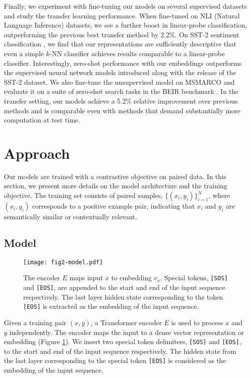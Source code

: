 \documentclass[nohyperref]{article}
\begin{document}
Finally, we experiment with fine-tuning our models on several supervised datasets and study the transfer learning performance. When fine-tuned on NLI (Natural Language Inference) datasets, we see a further boost in linear-probe classification, outperforming the previous best transfer method \cite{simcse} by 2.2\%. On SST-2 sentiment classification \cite{sst}, we find that our representations are sufficiently descriptive that even a simple $k$-NN classifier achieves results comparable to a linear-probe classifier. Interestingly, zero-shot performance with our embeddings outperforms the supervised neural network models introduced along with the release of the SST-2 dataset.  We also fine-tune the unsupervised model on MSMARCO and evaluate it on a suite of zero-shot search tasks in the BEIR benchmark \cite{beir}. In the transfer setting, our models achieve a 5.2\% relative improvement over previous methods \cite{contreiver} and is comparable even with methods \cite{colbert,splade,mini} that demand substantially more computation at test time.


\section{Approach}
\label{sec:approach}

Our models are trained with a contrastive objective on paired data. In this section, we present more details on the model architecture and the training objective. The training set consists of paired samples, $\{(x_i,y_i)\}^N_{i=1}$, where $(x_i,y_i)$ corresponds to a positive example pair, indicating that $x_i$ and $y_i$ are semantically similar or contextually relevant.

\subsection{Model}
\label{sec:model}

\begin{figure}[h]
\centering
\texttt{[image: fig2-model.pdf]}
\caption{The encoder $E$ maps input $x$ to embedding $v_x$. Special tokens, \texttt{[SOS]} and \texttt{[EOS]}, are appended to the start and end of the input sequence respectively. The last layer hidden state corresponding to the token \texttt{[EOS]} is extracted as the embedding of the input sequence.}
\label{fig:model}
\end{figure}

Given a training pair $(x,y)$, a Transformer \cite{transformer} encoder $E$ is used to process $x$ and $y$ independently. The encoder maps the input to a dense vector representation or embedding (Figure \ref{fig:model}). We insert two special token delimiters, \texttt{[SOS]} and \texttt{[EOS]}, to the start and end of the input sequence respectively. The hidden state from the last layer corresponding to the special token \texttt{[EOS]} is considered as the embedding of the input sequence.
\end{document}
